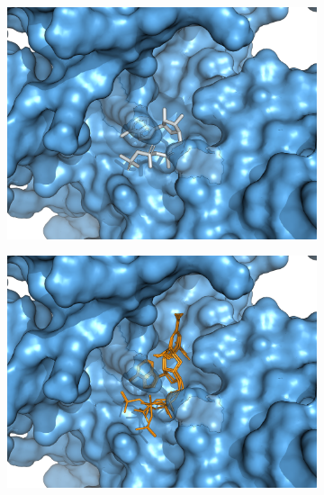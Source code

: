 \begin{figure}[h]
\begin{subfigure}[t]{0.30\textwidth}
	\end{subfigure}
	\vfill
	\begin{subfigure}[t]{0.4\textwidth}
		\caption{}\label{ch3fig:6c3p_bound}
		\centering
		\includegraphics[width=\textwidth]{6c3p_site_bound.png}
	\end{subfigure}
	\hfill
	\begin{subfigure}[t]{0.4\textwidth}
		\caption{}\label{ch3fig:6c3p_docked}
		\centering
		\includegraphics[width=\textwidth]{6c3p_site_docked.png}
	\end{subfigure}
	

\end{figure}
